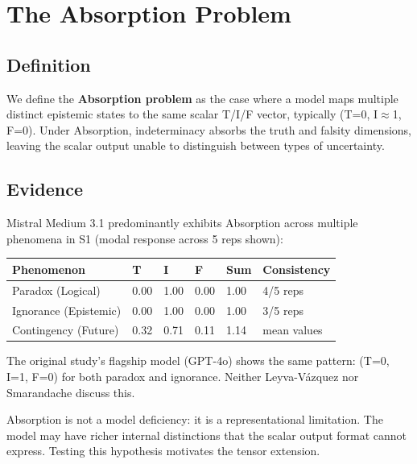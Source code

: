 \section{The Absorption Problem}

\subsection{Definition}

We define the \textbf{Absorption problem} as the case where a model maps
multiple distinct epistemic states to the same scalar T/I/F vector,
typically (T=0, I$\approx$1, F=0). Under Absorption, indeterminacy absorbs the
truth and falsity dimensions, leaving the scalar output unable to
distinguish between types of uncertainty.

\subsection{Evidence}

Mistral Medium 3.1 predominantly exhibits Absorption across multiple
phenomena in S1 (modal response across 5 reps shown):

\begin{longtable}[]{@{}llllll@{}}
\toprule\noalign{}
Phenomenon & T & I & F & Sum & Consistency \\
\midrule\noalign{}
\endhead
\bottomrule\noalign{}
\endlastfoot
Paradox (Logical) & 0.00 & 1.00 & 0.00 & 1.00 & 4/5 reps \\
Ignorance (Epistemic) & 0.00 & 1.00 & 0.00 & 1.00 & 3/5 reps \\
Contingency (Future) & 0.32 & 0.71 & 0.11 & 1.14 & mean values \\
\end{longtable}

The original study's flagship model (GPT-4o) shows the same pattern:
(T=0, I=1, F=0) for both paradox and ignorance. Neither Leyva-Vázquez
nor Smarandache discuss this.

Absorption is not a model deficiency: it is a representational
limitation. The model may have richer internal distinctions that the
scalar output format cannot express. Testing this hypothesis motivates
the tensor extension.
